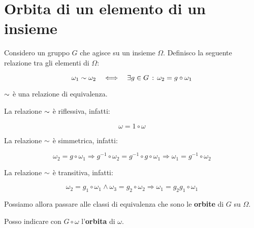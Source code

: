 \section{Orbita di un elemento di un insieme}
\label{sec:orbita_di_un_elemento_di_un_insieme}

Considero un gruppo $G$ che agisce su un insieme $\Omega$. Definisco la seguente relazione tra gli elementi di $\Omega$:

\begin{equation}
	\omega_1 \sim \omega_2 \quad\Longleftrightarrow\quad \exists g \in G \,:\, \omega_2 = g \circ \omega_1
\end{equation}

\begin{teorema}
	$\sim$ è una relazione di equivalenza.
\end{teorema}
\begin{dimostrazione}
	La relazione $\sim$ è riflessiva, infatti:
	
	\begin{equation}
		\omega = 1 \circ \omega
	\end{equation}

	La relazione $\sim$ è simmetrica, infatti:
	
	\begin{equation}
		\omega_2 = g \circ \omega_1 \Longrightarrow g^{-1} \circ \omega_2 = g^{-1} \circ g \circ \omega_1 \Longrightarrow \omega_1 = g^{-1} \circ \omega_2
	\end{equation}

	La relazione $\sim$ è transitiva, infatti:
	
	\begin{equation}
		\omega_2 = g_1 \circ \omega_1 \land \omega_3 = g_2 \circ \omega_2 \Longrightarrow \omega_1 = g_2g_1 \circ \omega_1
	\end{equation}
\end{dimostrazione}

Possiamo allora passare alle classi di equivalenza che sono le \textbf{orbite} di $G$ su $\Omega$.

Posso indicare con $G \circ \omega$ l'\textbf{orbita} di $\omega$.

